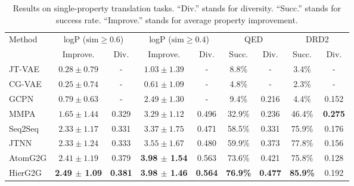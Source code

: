 \documentclass{article} \usepackage{iclr2020_conference,times}
\begin{document}
\begin{table}[t]
\centering
\caption{Results on single-property translation tasks. ``Div.'' stands for diversity. ``Succ.'' stands for success rate. ``Improve.'' stands for average property improvement.}
\vspace{-4pt}
\begin{tabular}{lcccccccc}
\hline
\multirow{2}{*}{Method} & \multicolumn{2}{c}{ logP ($\mathrm{sim} \geq 0.6$) } & \multicolumn{2}{c}{ logP ($\mathrm{sim} \geq 0.4$) } & \multicolumn{2}{c}{ QED } & \multicolumn{2}{c}{ DRD2 } \Tstrut\Bstrut \\
\cline{2-9}
& Improve. & Div. & Improve. & Div. & Succ. & Div. & Succ. & Div. \Tstrut\Bstrut \\
\hline
JT-VAE & $0.28 \pm 0.79$ & - & $1.03 \pm 1.39$ & - & 8.8\% & - & 3.4\% & - \Tstrut\Bstrut \\
CG-VAE & $0.25 \pm 0.74$ & - & $0.61 \pm 1.09$ & - & 4.8\% & - & 2.3\% & - \Tstrut\Bstrut \\
GCPN & $0.79 \pm 0.63$ & - & $2.49 \pm 1.30$ & - & 9.4\% & 0.216 & 4.4\% & 0.152 \Tstrut\Bstrut \\
MMPA & $1.65 \pm 1.44$ & 0.329 & $3.29 \pm 1.12$ & 0.496 & 32.9\% & 0.236 & 46.4\% & \textbf{0.275} \Tstrut\Bstrut \\
Seq2Seq & $2.33 \pm 1.17$ & 0.331 & $3.37 \pm 1.75$ & 0.471 & 58.5\% & 0.331 & 75.9\% & 0.176 \Tstrut\Bstrut \\
JTNN & $2.33 \pm 1.24$ & 0.333 & $3.55 \pm 1.67$ & 0.480 & 59.9\% & 0.373 & 77.8\% & 0.156 \Tstrut\Bstrut \\
AtomG2G & $2.41 \pm 1.19$ & 0.379 & \textbf{3.98 $\pm$ 1.54} & 0.563 & 73.6\% & 0.421 & 75.8\% & 0.128 \Tstrut\Bstrut \\
\hline
HierG2G & \textbf{2.49 $\pm$ 1.09} & \textbf{0.381} & \textbf{3.98 $\pm$ 1.46} & \textbf{0.564} & \textbf{76.9\%} & \textbf{0.477} & \textbf{85.9\%} & 0.192 \Tstrut\Bstrut \\
\hline
\end{tabular}
\label{tab:prop1}
\vspace{-6pt}
\end{table}
\end{document}
